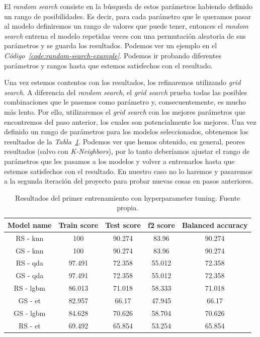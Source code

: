El \textit{random search} consiste en la búsqueda de estos parámetros habiendo definido un rango de posibilidades. Es decir, para cada parámetro que le queramos
pasar al modelo definiremos un rango de valores que puede tener, entonces el \textit{random search} entrena el modelo repetidas veces con una permutación aleatoria de sus 
parámetros y se guarda los resultados. Podemos ver un ejemplo en el \textit{Código\ \ref{code:random-search-example}}.
Podemos ir probando diferentes parámetros y rangos hasta que estemos satisfechos con el resultado.


Una vez estemos contentos con los resultados, los refinaremos utilizando \textit{grid search}. A diferencia del \textit{random search}, el \textit{grid search} prueba todas
las posibles combinaciones que le pasemos como parámetro y, consecuentemente, es mucho más lento. Por ello, utilizaremos el \textit{grid search} con los mejores parámetros que
encontremos del paso anterior, los cuales son potencialmente los mejores. Una vez definido un rango de parámetros para los modelos seleccionados, obtenemos los resultados
de la \textit{Tabla\ \ref{tab:hyperparameter-tuning-results}}. Podemos ver que hemos obtenido, en general, peores resultados (salvo con \textit{K-Neighbors}), por lo tanto
deberíamos ajustar el rango de parámetros que les pasamos a los modelos y volver a entrenarlos hasta que estemos satisfechos con el resultado. En nuestro caso no lo haremos
y pasaremos a la segunda iteración del proyecto para probar nuevas cosas en pasos anteriores.

\begin{table}[!h]
    \centering
    \begin{tabular}{|c|cccc|}
        \hline
        Model name & Train score & Test score & f2 score & Balanced accuracy \\ \hline
        RS - knn & 100 & 90.274 & 83.96 & 90.274 \\
        GS - knn & 100 & 90.274 & 83.96 & 90.274 \\
        RS - qda & 97.491 & 72.358 & 55.012 & 72.358 \\
        GS - qda & 97.491 & 72.358 & 55.012 & 72.358 \\
        RS - lgbm & 86.013 & 71.018 & 58.333 & 71.018 \\
        GS - et & 82.957 & 66.17 & 47.945 & 66.17 \\
        GS - lgbm & 84.628 & 70.626 & 58.704 & 70.626 \\
        RS - et & 69.492 & 65.854 & 53.254 & 65.854 \\ \hline
        \end{tabular}
    
    \caption{Resultados del primer entrenamiento con hyperparameter tuning. Fuente propia.}\ \label{tab:hyperparameter-tuning-results}
\end{table}
\clearpage

